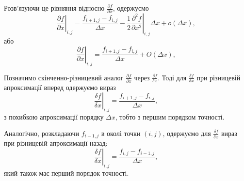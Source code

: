 Розв'язуючи це рівняння відносно $\frac{\partial f}{\partial x}$, одержуємо
\begin{equation*}
    \left. \frac{\partial f}{\partial x} \right|_{i, j} = \frac{f_{i + 1, j} - f_{i, j}}{\Delta x} - \frac{1}{2} \left. \frac{\partial^2 f}{\partial x^2} \right|_{i, j} \Delta x + o(\Delta x),
\end{equation*}
або
\begin{equation}
    \label{eq:2.2}
    \left. \frac{\partial f}{\partial x} \right|_{i, j} = \frac{f_{i + 1, j} - f_{i, j}}{\Delta x} + O(\Delta x),
\end{equation}

\begin{th_formula}
    Позначимо скінченно-різницевий аналог $\frac{\partial f}{\partial x}$ через $\frac{\delta f}{\delta x}$. Тоді для $\frac{\delta f}{\delta x}$ при різницевій апроксимації вперед одержуємо вираз
    \begin{equation}
        \label{eq:2.3}
        \left. \frac{\delta f}{\delta x} \right|_{i, j} = \frac{f_{i + 1, j} - f_{i, j}}{\Delta x},
    \end{equation}
    з похибкою апроксимації порядку $\Delta x$, тобто з першим порядком точності. \medskip
\end{th_formula}

\begin{th_formula}
    Аналогічно, розкладаючи $f_{i - 1, j}$ в околі точки $(i, j)$, одержуємо для $\frac{\delta f}{\delta x}$ вираз при різницевій апроксимації назад:
    \begin{equation}
        \label{eq:2.4}
        \left. \frac{\delta f}{\delta x} \right|_{i, j} = \frac{f_{i, j} - f_{i - 1, j}}{\Delta x},
    \end{equation}
    який також має перший порядок точності. 
\end{th_formula}


